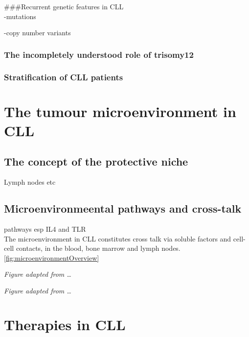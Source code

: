 \documentclass[11pt, a4paper, twosided]{book}
\begin{document}
\#\#\#Recurrent genetic features in CLL\\
-mutations

-copy number variants

\hypertarget{the-incompletely-understood-role-of-trisomy12}{%
\subsection{The incompletely understood role of trisomy12}\label{the-incompletely-understood-role-of-trisomy12}}

\hypertarget{stratification-of-cll-patients}{%
\subsection{Stratification of CLL patients}\label{stratification-of-cll-patients}}

\hypertarget{the-tumour-microenvironment-in-cll}{%
\chapter{The tumour microenvironment in CLL}\label{the-tumour-microenvironment-in-cll}}

\hypertarget{the-concept-of-the-protective-niche}{%
\section{The concept of the protective niche}\label{the-concept-of-the-protective-niche}}

Lymph nodes etc

\hypertarget{microenvironmeental-pathways-and-cross-talk}{%
\section{Microenvironmeental pathways and cross-talk}\label{microenvironmeental-pathways-and-cross-talk}}

pathways esp IL4 and TLR\\
The microenvironment in CLL constitutes cross talk via soluble factors and cell-cell contacts, in the blood, bone marrow and lymph nodes. \ref{fig:microenvironmentOverview}

\emph{Figure adapted from \ldots{}}

\emph{Figure adapted from \ldots{}}

\hypertarget{therapies-in-cll}{%
\chapter{Therapies in CLL}\label{therapies-in-cll}}
\end{document}
